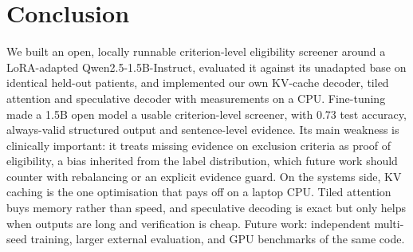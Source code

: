 \section{Conclusion}
\label{sec:conclusion}
We built an open, locally runnable criterion-level eligibility screener around a LoRA-adapted Qwen2.5-1.5B-Instruct, evaluated it against its unadapted base on identical held-out patients, and implemented our own KV-cache decoder, tiled attention and speculative decoder with measurements on a CPU. Fine-tuning made a 1.5B open model a usable criterion-level screener, with 0.73 test accuracy, always-valid structured output and sentence-level evidence. Its main weakness is clinically important: it treats missing evidence on exclusion criteria as proof of eligibility, a bias inherited from the label distribution, which future work should counter with rebalancing or an explicit evidence guard. On the systems side, KV caching is the one optimisation that pays off on a laptop CPU. Tiled attention buys memory rather than speed, and speculative decoding is exact but only helps when outputs are long and verification is cheap. Future work: independent multi-seed training, larger external evaluation, and GPU benchmarks of the same code.
